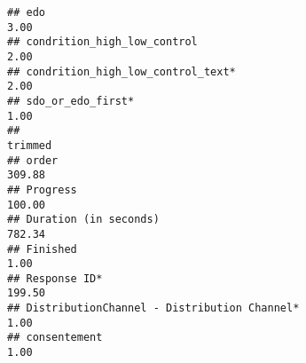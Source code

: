 \documentclass[
]{article}
\begin{document}
\begin{verbatim}
## edo                                                                                                                                                                                                                          3.00
## condrition_high_low_control                                                                                                                                                                                                  2.00
## condrition_high_low_control_text*                                                                                                                                                                                            2.00
## sdo_or_edo_first*                                                                                                                                                                                                            1.00
##                                                                                                                                                                                                                            trimmed
## order                                                                                                                                                                                                                       309.88
## Progress                                                                                                                                                                                                                    100.00
## Duration (in seconds)                                                                                                                                                                                                       782.34
## Finished                                                                                                                                                                                                                      1.00
## Response ID*                                                                                                                                                                                                                199.50
## DistributionChannel - Distribution Channel*                                                                                                                                                                                   1.00
## consentement                                                                                                                                                                                                                  1.00

\end{verbatim}
\end{document}
